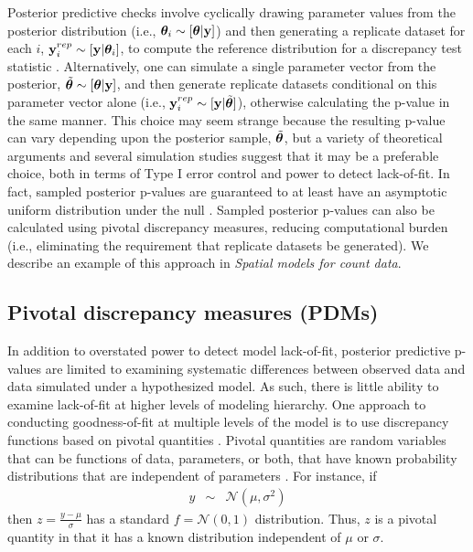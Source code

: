 \documentclass[12pt,english]{article}
\begin{document}
\begin{spacing}{1.9}
Posterior predictive checks involve cyclically drawing parameter
values from the posterior distribution (i.e.,
$\boldsymbol{\theta}_i \sim [\boldsymbol{\theta}| {\bf y}]$) and then generating a replicate
dataset for each $i$, ${\bf y}_i^{rep} \sim [{\bf y} | \boldsymbol{\theta}_i]$, to
compute the reference distribution for a discrepancy test statistic
\citep[][; Appendix A, Alg. 2]{GelmanEtAl2004}.  Alternatively, one
can simulate a single parameter vector from the posterior,
$\tilde{\boldsymbol{\theta}} \sim [\boldsymbol{\theta}| {\bf y}]$, and then generate replicate
datasets conditional on this parameter vector alone (i.e.,
${\bf y}_i^{rep} \sim [{\bf y} | \tilde{\boldsymbol{\theta}}]$), otherwise calculating
the p-value in the same manner.  This choice may seem strange because
the resulting p-value can vary depending upon the posterior sample,
$\tilde{\boldsymbol{\theta}}$, but a variety of theoretical arguments
\citep[e.g.,][]{Johnson2004,Johnson2007,YuanJohnson2012,Gosselin2011}
and several simulation studies \citep[e.g.,][]{Gosselin2011,Zhang2014}
suggest that it may be a preferable choice, both in terms of Type I
error control and power to detect lack-of-fit.  In fact, sampled
posterior p-values are guaranteed to at least have an asymptotic
uniform distribution under the null \citep[i.e., when the model fit to
the data is the ``true" model][]{Gosselin2011}.  Sampled posterior
p-values can also be calculated using pivotal discrepancy measures,
reducing computational burden (i.e., eliminating the requirement that
replicate datasets be generated). We describe an example of this
approach in \textit{Spatial models for count data}.

\subsection{Pivotal discrepancy measures (PDMs)}

In addition to overstated power to detect model lack-of-fit, posterior
predictive p-values are limited to examining systematic differences
between observed data and data simulated under a hypothesized model.
As such, there is little ability to examine lack-of-fit at higher
levels of modeling hierarchy.  One approach to conducting
goodness-of-fit at multiple levels of the model is to use discrepancy
functions based on pivotal quantities
\citep{Johnson2004,YuanJohnson2012}.  Pivotal quantities are random
variables that can be functions of data, parameters, or both, that
have known probability distributions that are independent of
parameters \citep[see e.g.,][section 9.2.2]{CasellaBerger1990}.  For
instance, if
\begin{eqnarray*}
  y & \sim & \mathcal{N}(\mu,\sigma^2)
\end{eqnarray*}
then $z = \frac{y-\mu}{\sigma}$ has a standard $f=\mathcal{N}(0,1)$
distribution. Thus, $z$ is a pivotal quantity in that it has a known
distribution independent of $\mu$ or $\sigma$.


\end{spacing}
\end{document}
